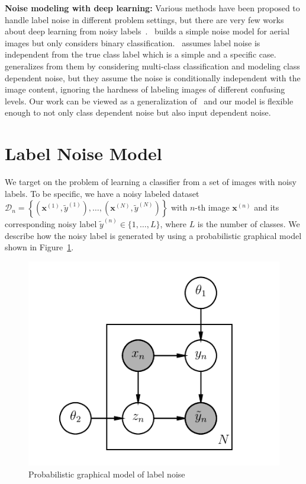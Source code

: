 \documentclass[10pt,twocolumn,letterpaper]{article}
\def\vec{\mathbf}
\begin{document}
{\bf Noise modeling with deep learning:} Various methods have been proposed to handle label noise in different problem settings, but there are very few works about deep learning from noisy labels~\cite{mnih2012learning, larsen1998design, sukhbaatar2014learning}.~\cite{mnih2012learning} builds a simple noise model for aerial images but only considers binary classification.~\cite{larsen1998design} assumes label noise is independent from the true class label which is a simple and a specific case.~\cite{sukhbaatar2014learning} generalizes from them by considering multi-class classification and modeling class dependent noise, but they assume the noise is conditionally independent with the image content, ignoring the hardness of labeling images of different confusing levels. Our work can be viewed as a generalization of~\cite{sukhbaatar2014learning,natarajan2013learning} and our model is flexible enough to not only class dependent noise but also input dependent noise.

\section{Label Noise Model} %
\label{sec:label_noise_model}
We target on the problem of learning a classifier from a set of images with noisy labels. To be specific, we have a noisy labeled dataset $\mathcal{D}_n=\left\{\left(\vec{x}^{(1)}, \tilde{y}^{(1)}\right), \dots, \left(\vec{x}^{(N)}, \tilde{y}^{(N)}\right)\right\}$ with $n$-th image $\vec{x}^{(n)}$ and its corresponding noisy label $\tilde{y}^{(n)} \in \{1,\dots,L\}$, where $L$ is the number of classes. We describe how the noisy label is generated by using a probabilistic graphical model shown in Figure~\ref{fig:noise_pgm}.

\begin{figure}[h!]
\begin{center}
\includegraphics[width=0.5\linewidth]{figure/pgm.pdf}
\end{center}
\caption{Probabilistic graphical model of label noise}
\label{fig:noise_pgm}
\end{figure}
\end{document}
